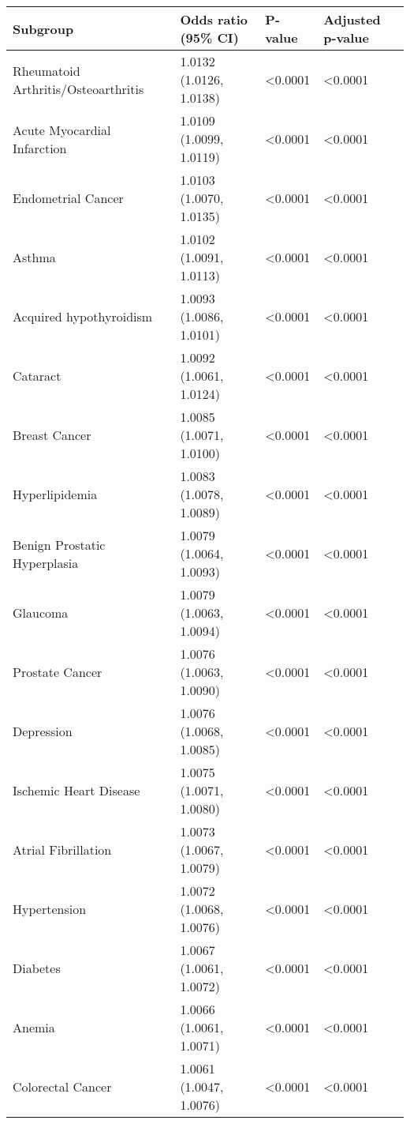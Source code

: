 \begin{table}[ht]
\centering
\begin{tabular}{llll}
  \hline
Subgroup & Odds ratio (95\% CI) & P-value & Adjusted p-value \\ 
  \hline
Rheumatoid Arthritis/Osteoarthritis & 1.0132 (1.0126, 1.0138) & \textless 0.0001 & \textless 0.0001 \\ 
  Acute Myocardial Infarction & 1.0109 (1.0099, 1.0119) & \textless 0.0001 & \textless 0.0001 \\ 
  Endometrial Cancer & 1.0103 (1.0070, 1.0135) & \textless 0.0001 & \textless 0.0001 \\ 
  Asthma & 1.0102 (1.0091, 1.0113) & \textless 0.0001 & \textless 0.0001 \\ 
  Acquired hypothyroidism & 1.0093 (1.0086, 1.0101) & \textless 0.0001 & \textless 0.0001 \\ 
  Cataract & 1.0092 (1.0061, 1.0124) & \textless 0.0001 & \textless 0.0001 \\ 
  Breast Cancer & 1.0085 (1.0071, 1.0100) & \textless 0.0001 & \textless 0.0001 \\ 
  Hyperlipidemia & 1.0083 (1.0078, 1.0089) & \textless 0.0001 & \textless 0.0001 \\ 
  Benign Prostatic Hyperplasia & 1.0079 (1.0064, 1.0093) & \textless 0.0001 & \textless 0.0001 \\ 
  Glaucoma & 1.0079 (1.0063, 1.0094) & \textless 0.0001 & \textless 0.0001 \\ 
  Prostate Cancer & 1.0076 (1.0063, 1.0090) & \textless 0.0001 & \textless 0.0001 \\ 
  Depression & 1.0076 (1.0068, 1.0085) & \textless 0.0001 & \textless 0.0001 \\ 
  Ischemic Heart Disease & 1.0075 (1.0071, 1.0080) & \textless 0.0001 & \textless 0.0001 \\ 
  Atrial Fibrillation & 1.0073 (1.0067, 1.0079) & \textless 0.0001 & \textless 0.0001 \\ 
  Hypertension & 1.0072 (1.0068, 1.0076) & \textless 0.0001 & \textless 0.0001 \\ 
  Diabetes & 1.0067 (1.0061, 1.0072) & \textless 0.0001 & \textless 0.0001 \\ 
  Anemia & 1.0066 (1.0061, 1.0071) & \textless 0.0001 & \textless 0.0001 \\ 
  Colorectal Cancer & 1.0061 (1.0047, 1.0076) & \textless 0.0001 & \textless 0.0001 \\ 

\end{tabular}
\end{table}
